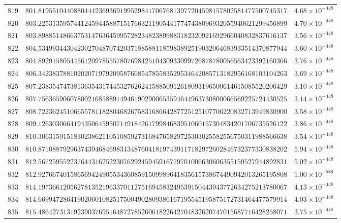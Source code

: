 \documentclass[12pt,reqno]{amsart}
\theoremstyle{remark}
\begin{document}
\begin{longtable}{clc}
$819$ & $801.8195510440880444236936919952984170676813977204598157802581477500745317$ & $4.68\times 10^{-448}$ \\
$820$ & $803.2253135957441245944588715176632119054417747438096932055940621299456899$ & $4.70\times 10^{-448}$ \\
$821$ & $803.8988514866375314763645995728234823899883182320921692966040832837616137$ & $3.56\times 10^{-448}$ \\
$822$ & $804.5349934430423027048707420371885881185983892519032064683933514370877944$ & $3.60\times 10^{-448}$ \\
$823$ & $804.8929158054456120978555780769842510430933099726878780056563423392160366$ & $3.76\times 10^{-448}$ \\
$824$ & $806.3423837881020207197920958766854785583529534642085713182956168103104263$ & $3.69\times 10^{-448}$ \\
$825$ & $807.2383547473813635431744532762624158850912618093196500614615085520206429$ & $3.10\times 10^{-448}$ \\
$826$ & $807.7563659060780021685889149461902900653594644963730800066569225724430525$ & $3.14\times 10^{-448}$ \\
$827$ & $808.7223624510665578118280468267583168664287725125107706220832713949830900$ & $3.58\times 10^{-448}$ \\
$828$ & $809.1263030664194350645950714918426179984683951060157304834201706735526122$ & $3.86\times 10^{-448}$ \\
$829$ & $810.3063159151830238621105108592731684765829725303025582556750311988566638$ & $3.54\times 10^{-448}$ \\
$830$ & $810.8710887929637439468469831348760418197439117182972602846732377330838202$ & $5.94\times 10^{-448}$ \\
$831$ & $812.5672595522376443162522307629245945916779701006630606355159527944892831$ & $5.02\times 10^{-448}$ \\
$832$ & $812.9276674015865694249055343608591509989641835615738674490942013265195808$ & $1.00\times 10^{-586}$ \\
$833$ & $814.1973661205627813521963370112751694583249539150443943772634275213780067$ & $4.13\times 10^{-448}$ \\
$834$ & $814.6699472864190206010825175004902809386167195545195875172731464477579914$ & $4.03\times 10^{-448}$ \\
$835$ & $815.4864273131923903769516487278526061822642704832620747015687716428258071$ & $3.75\times 10^{-448}$ \\

\end{longtable}
\end{document}
